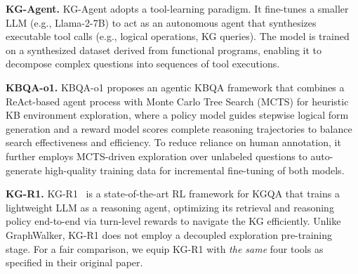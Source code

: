 \textbf{KG-Agent.}
KG-Agent \citep{jiang2025kg} adopts a tool-learning paradigm. It fine-tunes a smaller LLM (e.g., Llama-2-7B) to act as an autonomous agent that synthesizes executable tool calls (e.g., logical operations, KG queries). The model is trained on a synthesized dataset derived from functional programs, enabling it to decompose complex questions into sequences of tool executions.

\textbf{KBQA-o1.}
KBQA-o1 \citep{luo2025kbqa} proposes an agentic KBQA framework that combines a ReAct-based agent process with Monte Carlo Tree Search (MCTS) for heuristic KB environment exploration, where a policy model guides stepwise logical form generation and a reward model scores complete reasoning trajectories to balance search effectiveness and efficiency. To reduce reliance on human annotation, it further employs MCTS-driven exploration over unlabeled questions to auto-generate high-quality training data for incremental fine-tuning of both models.

\textbf{KG-R1.}
KG-R1~\citep{song2025efficient} is a state-of-the-art RL framework for KGQA that trains a lightweight LLM as a reasoning agent, optimizing its retrieval and reasoning policy end-to-end via turn-level rewards to navigate the KG efficiently. Unlike GraphWalker, KG-R1 does not employ a decoupled exploration pre-training stage. For a fair comparison, we equip KG-R1 with \textit{the same} four tools as specified in their original paper.